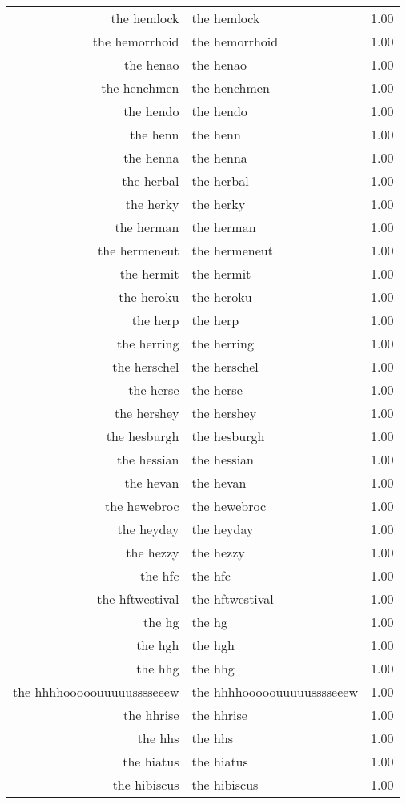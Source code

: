 \begin{table}[ht]
\begin{tabular}{rlr}
  the hemlock & the hemlock & 1.00 \\ 
  the hemorrhoid & the hemorrhoid & 1.00 \\ 
  the henao & the henao & 1.00 \\ 
  the henchmen & the henchmen & 1.00 \\ 
  the hendo & the hendo & 1.00 \\ 
  the henn & the henn & 1.00 \\ 
  the henna & the henna & 1.00 \\ 
  the herbal & the herbal & 1.00 \\ 
  the herky & the herky & 1.00 \\ 
  the herman & the herman & 1.00 \\ 
  the hermeneut & the hermeneut & 1.00 \\ 
  the hermit & the hermit & 1.00 \\ 
  the heroku & the heroku & 1.00 \\ 
  the herp & the herp & 1.00 \\ 
  the herring & the herring & 1.00 \\ 
  the herschel & the herschel & 1.00 \\ 
  the herse & the herse & 1.00 \\ 
  the hershey & the hershey & 1.00 \\ 
  the hesburgh & the hesburgh & 1.00 \\ 
  the hessian & the hessian & 1.00 \\ 
  the hevan & the hevan & 1.00 \\ 
  the hewebroc & the hewebroc & 1.00 \\ 
  the heyday & the heyday & 1.00 \\ 
  the hezzy & the hezzy & 1.00 \\ 
  the hfc & the hfc & 1.00 \\ 
  the hftwestival & the hftwestival & 1.00 \\ 
  the hg & the hg & 1.00 \\ 
  the hgh & the hgh & 1.00 \\ 
  the hhg & the hhg & 1.00 \\ 
  the hhhhooooouuuuusssseeew & the hhhhooooouuuuusssseeew & 1.00 \\ 
  the hhrise & the hhrise & 1.00 \\ 
  the hhs & the hhs & 1.00 \\ 
  the hiatus & the hiatus & 1.00 \\ 
  the hibiscus & the hibiscus & 1.00 \\ 

\end{tabular}
\end{table}
